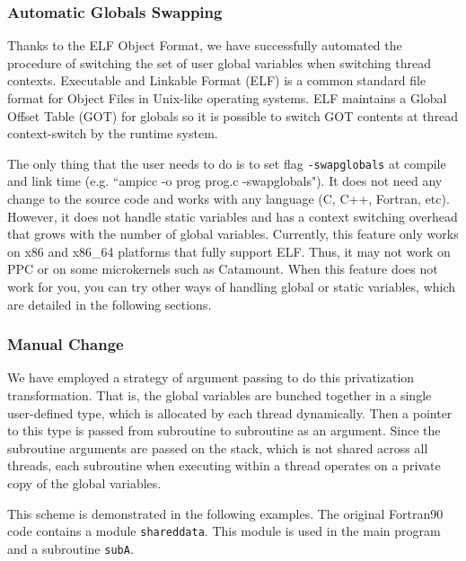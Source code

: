 \documentclass[10pt]{article}
\begin{document}
\subsubsection{Automatic Globals Swapping}
Thanks to the ELF Object Format, we have successfully automated the procedure 
of switching the set of user global variables when switching thread contexts.
Executable and Linkable Format (ELF) is a common standard file format 
for Object Files in Unix-like operating systems.
ELF maintains a Global Offset Table (GOT) for globals so it is possible to
switch GOT contents at thread context-switch by the runtime system.


The only thing that the user needs to do is to set flag {\tt -swapglobals}
at compile and link time (e.g. ``ampicc -o prog prog.c -swapglobals"). It does not need 
any change to the source code and works with any language (C, C++, Fortran, etc).
However, it does not handle static variables and has a context switching 
overhead that grows with the number of global variables.
Currently, this feature only works on x86 and x86\_64 
platforms that fully support ELF. Thus, it may not work on PPC or on some microkernels such as Catamount. When this feature does 
not work for you, you can try other ways of handling global or static variables, 
which are detailed in the following sections.

\subsubsection{Manual Change}
We have employed a strategy of argument passing to do this privatization
transformation. That is, the global variables are bunched together in a
single user-defined type, which is allocated by each thread dynamically. Then a
pointer to this type is passed from subroutine to subroutine as an argument.
Since the subroutine arguments are passed on the stack, which is not shared
across all threads, each subroutine when executing within a thread operates on
a private copy of the global variables. 

This scheme is demonstrated in the following examples. The original Fortran90
code contains a module \texttt{shareddata}. This module is used in the main
program and a subroutine \texttt{subA}.
\end{document}
